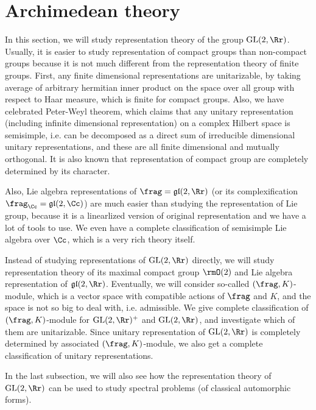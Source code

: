 \documentclass{article}
\newcommand{\GL}{\mathrm{GL}}
\begin{document}
\section{Archimedean theory}
In this section, we will study representation theory of the group $\GL(2, \Rr)$. 
Usually, it is easier to study representation of compact groups than non-compact groups because it is not much different from the representation theory of finite groups. First, any finite dimensional representations are unitarizable, by taking average of arbitrary hermitian inner product on the space over all group with respect to Haar measure, which is finite for compact groups. Also, we have celebrated Peter-Weyl theorem, which claims that any unitary representation (including infinite dimensional representation) on a complex Hilbert space is semisimple, i.e. can be decomposed as a direct sum of irreducible dimensional unitary representations, and these are all finite dimensional and mutually orthogonal. 
It is also known that representation of compact group are completely determined by its character. 

Also, Lie algebra representations of $\frag = \mathfrak{gl}(2, \Rr)$ (or its complexification $\frag_{\Cc} = \mathfrak{gl}(2, \Cc)$) are much easier than studying the representation of Lie group, because it is a linearlized version of original representation and we have a lot of tools to use. We even have a complete classification of semisimple Lie algebra over $\Cc$, which is a very rich theory itself. 

Instead of studying representations of $\GL(2, \Rr)$ directly, we will study representation theory of its maximal compact group $\rmO(2)$ and Lie algebra representation of $\mathfrak{gl}(2,\Rr)$. Eventually, we  will consider so-called $(\frag, K)$-module, which is a vector space with compatible actions of $\frag$ and $K$, and the space is not so big to deal with, i.e. admissible. 
We give complete classification of $(\frag, K)$-module for $\GL(2, \Rr)^{+}$ and $\GL(2, \Rr)$, and investigate which of them are unitarizable. 
Since unitary representation of $\GL(2, \Rr)$ is completely determined by associated $(\frag, K)$-module, we also get a complete classification of unitary representations. 

In the last subsection, we will also see how the representation theory of $\GL(2, \Rr)$ can be used to study spectral problems (of classical automorphic forms). 
\end{document}
